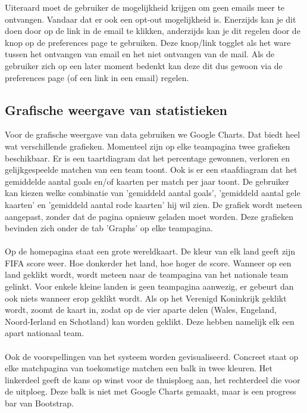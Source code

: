 \documentclass[11pt, a4paper]{article}
\begin{document}
Uiteraard moet de gebruiker de mogelijkheid krijgen om geen emails meer te ontvangen. Vandaar dat er ook een opt-out mogelijkheid is. Enerzijds kan je dit doen door op de link in de email te klikken,
anderzijds kan je dit regelen door de knop op de preferences page te gebruiken. Deze knop/link togglet als het ware tussen het ontvangen van email en het niet ontvangen van de mail. Als de gebruiker zich op een later moment
bedenkt kan deze dit dus gewoon via de preferences page (of een link in een email) regelen.

\subsection{Grafische weergave van statistieken}
Voor de grafische weergave van data gebruiken we Google Charts. Dat biedt heel wat verschillende grafieken. Momenteel zijn op elke teampagina twee grafieken beschikbaar. Er is een taartdiagram dat het percentage gewonnen, verloren en gelijkgespeelde matchen van een team toont. Ook is er een staafdiagram dat het gemiddelde aantal goals en/of kaarten per match per jaar toont. De gebruiker kan kiezen welke combinatie van 'gemiddeld aantal goals', 'gemiddeld aantal gele kaarten' en 'gemiddeld aantal rode kaarten' hij wil zien. De grafiek wordt meteen aangepast, zonder dat de pagina opnieuw geladen moet worden. Deze grafieken bevinden zich onder de tab 'Graphs' op elke teampagina. \\ \\
Op de homepagina staat een grote wereldkaart. De kleur van elk land geeft zijn FIFA score weer. Hoe donkerder het land, hoe hoger de score. Wanneer op een land geklikt wordt, wordt meteen naar de teampagina van het nationale team gelinkt. Voor enkele kleine landen is geen teampagina aanwezig, er gebeurt dan ook niets wanneer erop geklikt wordt. Als op het Verenigd Koninkrijk geklikt wordt, zoomt de kaart in, zodat op de vier aparte delen (Wales, Engeland, Noord-Ierland en Schotland) kan worden geklikt. Deze hebben namelijk elk een apart nationaal team. \\ \\
Ook de voorspellingen van het systeem worden gevisualiseerd. Concreet staat op elke matchpagina van toekomstige matchen een balk in twee kleuren. Het linkerdeel geeft de kans op winst voor de thuisploeg aan, het rechterdeel die voor de uitploeg. Deze balk is niet met Google Charts gemaakt, maar is een progress bar van Bootstrap.
\end{document}

